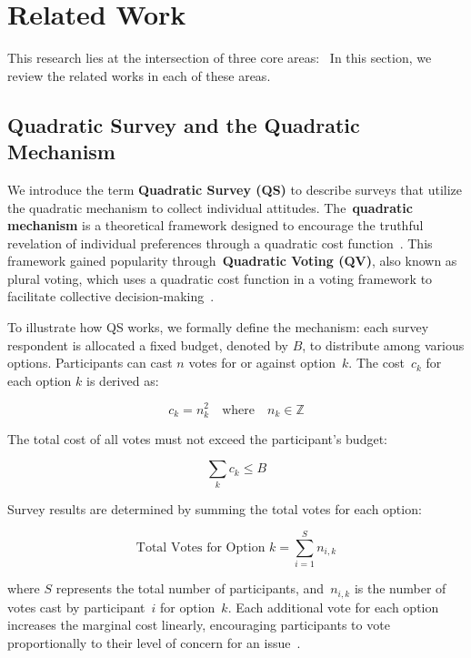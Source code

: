 \section{Related Work}
\label{sec:relatedWorks}
This research lies at the intersection of three core areas:~ In this section, we review the related works in each of these areas.

\subsection{Quadratic Survey and the Quadratic Mechanism}
We introduce the term \textbf{Quadratic Survey (QS)} to describe surveys that utilize the quadratic mechanism to collect individual attitudes. The~\textbf{quadratic mechanism} is a theoretical framework designed to encourage the truthful revelation of individual preferences through a quadratic cost function~\cite{grovesOptimalAllocationPublic1977}. This framework gained popularity through~\textbf{Quadratic Voting (QV)}, also known as plural voting, which uses a quadratic cost function in a voting framework to facilitate collective decision-making~\cite{lalley2016quadratic}.%

To illustrate how QS works, we formally define the mechanism: each survey respondent is allocated a fixed budget, denoted by $B$, to distribute among various options. Participants can cast $n$ votes for or against option~$k$. The cost~$c_k$ for each option $k$ is derived as:

\[c_k = n_k^2 \quad \text{where}\quad n_k \in \mathbb{Z}\]

The total cost of all votes must not exceed the participant's budget:

\[\sum_k c_k \leq B\]

Survey results are determined by summing the total votes for each option:

\[ \text{Total Votes for Option } k = \sum_{i=1}^{S} n_{i,k} \]

where $S$ represents the total number of participants, and~$n_{i,k}$ is the number of votes cast by participant~$i$ for option~$k$. Each additional vote for each option increases the marginal cost linearly, encouraging participants to vote proportionally to their level of concern for an issue~\cite{posner2018radical}.

